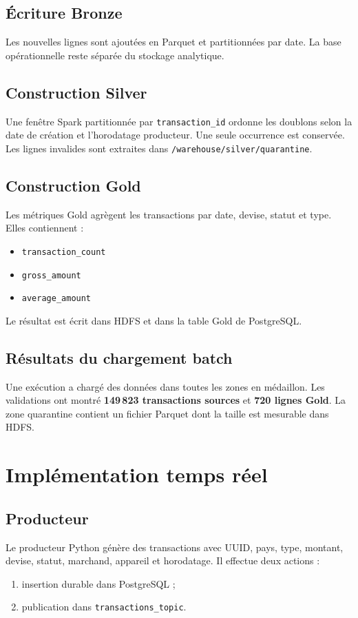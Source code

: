 \documentclass[11pt,a4paper]{report}
\begin{document}
\section{Écriture Bronze}
Les nouvelles lignes sont ajoutées en Parquet et partitionnées par date.
La base opérationnelle reste séparée du stockage analytique.

\section{Construction Silver}
Une fenêtre Spark partitionnée par \texttt{transaction\_id} ordonne les
doublons selon la date de création et l'horodatage producteur. Une seule
occurrence est conservée. Les lignes invalides sont extraites dans
\texttt{/warehouse/silver/quarantine}.

\section{Construction Gold}
Les métriques Gold agrègent les transactions par date, devise, statut et type.
Elles contiennent :
\begin{itemize}
\item \texttt{transaction\_count}
\item \texttt{gross\_amount}
\item \texttt{average\_amount}
\end{itemize}

Le résultat est écrit dans HDFS et dans la table Gold de PostgreSQL.

\section{Résultats du chargement batch}
Une exécution a chargé des données dans toutes les zones en médaillon. Les
validations ont montré \textbf{149\,823 transactions sources} et
\textbf{720 lignes Gold}. La zone quarantine contient un fichier Parquet
dont la taille est mesurable dans HDFS.

\chapter{Implémentation temps réel}

\section{Producteur}
Le producteur Python génère des transactions avec UUID, pays, type, montant,
devise, statut, marchand, appareil et horodatage. Il effectue deux actions :
\begin{enumerate}
\item insertion durable dans PostgreSQL ;
\item publication dans \texttt{transactions\_topic}.
\end{enumerate}
\end{document}
